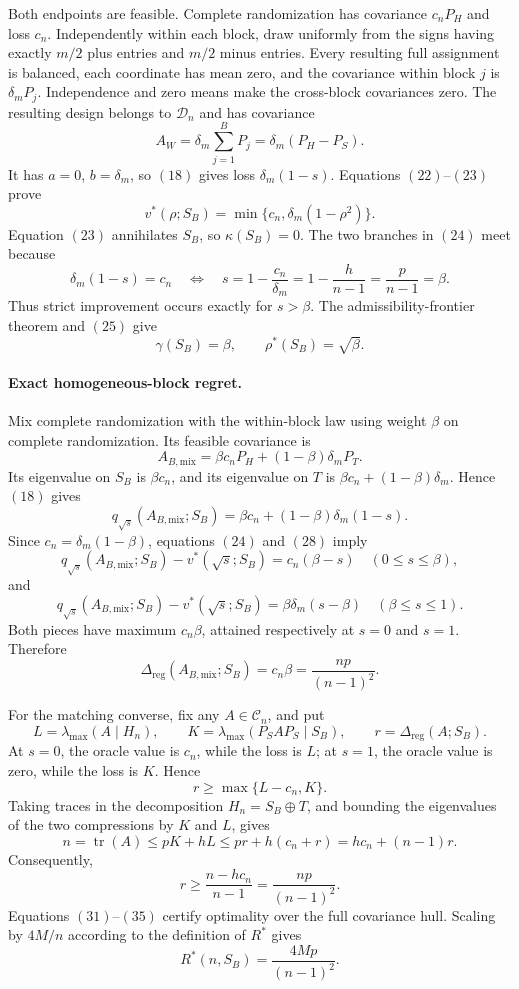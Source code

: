 Both endpoints are feasible.  Complete randomization has covariance \(c_nP_H\) and loss \(c_n\).  Independently within each block, draw uniformly from the signs having exactly \(m/2\) plus entries and \(m/2\) minus entries.  Every resulting full assignment is balanced, each coordinate has mean zero, and the covariance within block \(j\) is \(\delta_mP_j\).  Independence and zero means make the cross-block covariances zero.  The resulting design belongs to \(\mathcal D_n\) and has covariance
\[
A_W=\delta_m\sum_{j=1}^BP_j
=\delta_m(P_H-P_S).
\tag{23}
\]
It has \(a=0\), \(b=\delta_m\), so \((18)\) gives loss \(\delta_m(1-s)\).  Equations \((22)\)--\((23)\) prove
\[
v^*(\rho;S_B)
=\min\{c_n,\delta_m(1-\rho^2)\}.
\tag{24}
\]
Equation \((23)\) annihilates \(S_B\), so \(\kappa(S_B)=0\).  The two branches in \((24)\) meet because
\[
\delta_m(1-s)=c_n
\quad\Longleftrightarrow\quad
s=1-\frac{c_n}{\delta_m}
=1-\frac{h}{n-1}
=\frac{p}{n-1}=\beta.
\tag{25}
\]
Thus strict improvement occurs exactly for \(s>\beta\).  The admissibility-frontier theorem and \((25)\) give
\[
\gamma(S_B)=\beta,
\qquad
\rho^*(S_B)=\sqrt\beta.
\tag{26}
\]

\paragraph{Exact homogeneous-block regret.}
Mix complete randomization with the within-block law using weight \(\beta\) on complete randomization.  Its feasible covariance is
\[
A_{B,\mathrm{mix}}
=\beta c_nP_H+(1-\beta)\delta_mP_T.
\tag{27}
\]
Its eigenvalue on \(S_B\) is \(\beta c_n\), and its eigenvalue on \(T\) is \(\beta c_n+(1-\beta)\delta_m\).  Hence \((18)\) gives
\[
q_{\sqrt s}(A_{B,\mathrm{mix}};S_B)
=\beta c_n+(1-\beta)\delta_m(1-s).
\tag{28}
\]
Since \(c_n=\delta_m(1-\beta)\), equations \((24)\) and \((28)\) imply
\[
q_{\sqrt s}(A_{B,\mathrm{mix}};S_B)-v^*(\sqrt s;S_B)
=c_n(\beta-s)
\quad(0\leq s\leq\beta),
\tag{29}
\]
and
\[
q_{\sqrt s}(A_{B,\mathrm{mix}};S_B)-v^*(\sqrt s;S_B)
=\beta\delta_m(s-\beta)
\quad(\beta\leq s\leq1).
\tag{30}
\]
Both pieces have maximum \(c_n\beta\), attained respectively at \(s=0\) and \(s=1\).  Therefore
\[
\Delta_{\mathrm{reg}}(A_{B,\mathrm{mix}};S_B)
=c_n\beta
=\frac{np}{(n-1)^2}.
\tag{31}
\]

For the matching converse, fix any \(A\in\mathcal C_n\), and put
\[
L=\lambda_{\max}(A\mid H_n),
\qquad
K=\lambda_{\max}(P_SAP_S\mid S_B),
\qquad
r=\Delta_{\mathrm{reg}}(A;S_B).
\tag{32}
\]
At \(s=0\), the oracle value is \(c_n\), while the loss is \(L\); at \(s=1\), the oracle value is zero, while the loss is \(K\).  Hence
\[
r\geq\max\{L-c_n,K\}.
\tag{33}
\]
Taking traces in the decomposition \(H_n=S_B\mathbin\oplus T\), and bounding the eigenvalues of the two compressions by \(K\) and \(L\), gives
\[
n=\operatorname{tr}(A)
\leq pK+hL
\leq pr+h(c_n+r)
=hc_n+(n-1)r.
\tag{34}
\]
Consequently,
\[
r\geq\frac{n-hc_n}{n-1}
=\frac{np}{(n-1)^2}.
\tag{35}
\]
Equations \((31)\)--\((35)\) certify optimality over the full covariance hull.  Scaling by \(4M/n\) according to the definition of \(R^*\) gives
\[
R^*(n,S_B)=\frac{4Mp}{(n-1)^2}.
\tag{36}
\]

